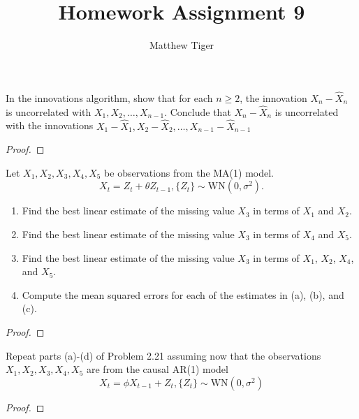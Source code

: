 \documentclass[12pt]{article}
\title{Homework Assignment 9}
\author{Matthew Tiger}
\theoremstyle{definition}
\newenvironment{custompbm}[1]
  {\renewcommand\theproblem{#1}\problem}
  {\endproblem}
\begin{document}
\maketitle


\begin{custompbm}{2.20}
  In the innovations algorithm, show that for each $n\geq 2$, the innovation
  $X_n - \hat{X}_n$ is uncorrelated with $X_1, X_2, \dots, X_{n-1}$. Conclude that
  $X_n - \hat{X}_n$ is uncorrelated with the innovations
  $X_1 - \hat{X}_1, X_2 - \hat{X}_2, \dots, X_{n-1} - \hat{X}_{n-1}$
\end{custompbm}

\begin{proof}
\end{proof}


\begin{custompbm}{2.21}
  Let $X_1, X_2, X_3, X_4, X_5$ be observations from the MA(1) model.
  \[
    X_t = Z_t + \theta Z_{t-1}, \{Z_t\} \sim \text{WN}(0, \sigma^2).
  \]
  \begin{enumerate}
    \item Find the best linear estimate of the missing value $X_3$ in terms of
      $X_1$ and $X_2$.
    \item Find the best linear estimate of the missing value $X_3$ in terms of
      $X_4$ and $X_5$.
    \item Find the best linear estimate of the missing value $X_3$ in terms of
      $X_1$, $X_2$, $X_4$, and $X_5$.
    \item Compute the mean squared errors for each of the estimates in (a),
      (b), and (c).
  \end{enumerate}
\end{custompbm}

\begin{proof}
\end{proof}


\begin{custompbm}{2.21}
  Repeat parts (a)-(d) of Problem 2.21 assuming now that the observations
  $X_1, X_2, X_3, X_4, X_5$ are from the causal AR(1) model
  \[
    X_t = \phi X_{t-1} + Z_t, \{Z_t\} \sim \text{WN}(0, \sigma^2)
  \]
\end{custompbm}

\begin{proof}
\end{proof}
\end{document}
